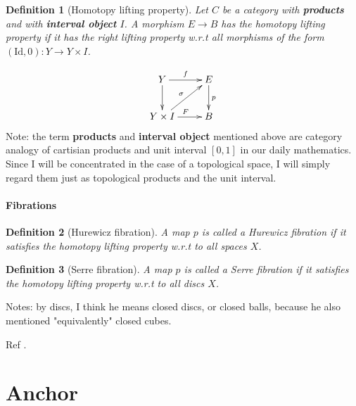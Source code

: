 \documentclass{article}
\numberwithin{equation}{subsection} %
\newtheorem{defi}{Definition}[section]
\theoremstyle{definition}
\begin{document}
    \begin{defi}[Homotopy lifting property]
    Let $C$ be a category with \textbf{products} and with \textbf{interval
    object} $I$. A morphism $E\to B$ has the homotopy lifting property if it
    has the right lifting property w.r.t all morphisms of the form
    $(\text{Id},0):Y \to Y\times I$.
    \end{defi}
    $$ \xymatrix{
        Y\ar[r]^f\ar[d]                 & E\ar[d]^p \\
        Y\times I\ar[r]^F\ar[ru]^\sigma & B
    }$$
    Note: the term \textbf{products} and \textbf{interval object} mentioned
    above are category analogy of cartisian products and unit interval $[0,1]$
    in our daily mathematics. Since I will be concentrated in the case of a
    topological space, I will simply regard them just as topological products
    and the unit interval.

    \paragraph{Fibrations}
    \begin{defi}[Hurewicz fibration]
        A map $p$ is called a Hurewicz fibration if it satisfies the homotopy
        lifting property w.r.t to all spaces $X$.
    \end{defi}
    \begin{defi}[Serre fibration]
        A map $p$ is called a Serre fibration if it satisfies the homotopy
        lifting property w.r.t to all discs $X$.
    \end{defi}
    Notes: by discs, I think he means closed discs, or closed balls, because he
    also mentioned "equivalently" closed cubes.

    Ref \cite{nlab-homotopy-lifting-property}.
\section{Anchor}
\label{sec:Anchor}
\end{document}
